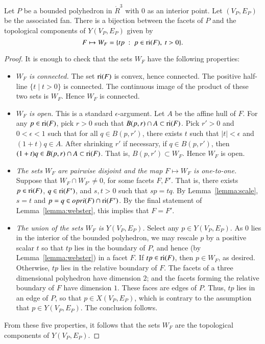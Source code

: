 \begin{lemma} Let $P$ be a bounded polyhedron in $\ring{R}^3$ with $0$ as an interior point.  Let $(V_P,E_P)$ be the associated fan.  There is a bijection between the facets of $P$ and the topological components of $Y(V_P,E_P)$ given by 
$$
F \mapsto W_F = \{t p \ :\  p\in {\operatorname{ri}}(F),~t >0\}.
$$
\end{lemma}

\begin{proof} It is enough to check that the sets $W_F$ have the following properties:
\begin{itemize}
\item {\it $W_F$ is connected.}  The set ${\operatorname{ri}}(F)$ is convex, hence connected.  The positive half-line $\{t\mid t>0\}$ is connected.  The continuous image of the product of these two sets is $W_F$.  Hence $W_F$ is connected.
\item {\it $W_F$ is  open.}  This is a standard $\epsilon$-argument.  Let $A$ be the affine hull of $F$.  For any $p\in {\operatorname{ri}}(F)$, pick $r>0$ such that $B(p,r)\cap A\subset {\operatorname{ri}}(F)$.  Pick $r'>0$ and $0<\epsilon<1$ such that for all $q\in B(p,r')$, there exists $t$ such that $|t|<\epsilon$ and $(1+t)q\in A$.  After shrinking $r'$ if necessary,  if $q\in B(p,r')$, then $(1+t)q \in B(p,r)\cap A \subset {\operatorname{ri}}(F)$.   That is, $B(p,r')\subset W_F$.  Hence $W_F$ is open.
\item {\it The sets $W_F$ are pairwise disjoint and the map $F\mapsto W_F$ is one-to-one.}  Suppose  that $W_F\cap W_{F'}\ne 0$, for some facets $F, F'$.  That is, there exists $p\in {\operatorname{ri}}(F)$, $q\in {\operatorname{ri}}(F')$, and $s,t>0$ such that
$s p = t q$.  By Lemma~\ref{lemma:scale}, $s=t$ and $p=q\in op{ri}(F)\cap {\operatorname{ri}}(F')$.  By the final statement of Lemma~\ref{lemma:webster}, this implies that $F=F'$.
\item {\it The union of the sets $W_F$ is $Y(V_P,E_P)$.}  Select any $p\in Y(V_P,E_P)$.  As $0$ lies in the interior of the bounded polyhedron, we may rescale $p$ by a positive scalar $t$ so that $t p$ lies in the boundary of $P$, and hence (by Lemma~\ref{lemma:webster}) in a facet $F$.  If $t p \in {\operatorname{ri}}(F)$, then $p\in W_F$, as desired.  Otherwise, $t p$ lies in the relative boundary of $F$.  The facets of a three dimensional polyhedron have dimension $2$; and the facets forming the relative boundary of $F$ have dimension $1$.  These faces are edges of $P$.  Thus, $t p$ lies in an edge of $P$, so that $p\in X(V_P,E_P)$, which is contrary to the assumption that $p\in Y(V_P,E_P)$.  The conclusion follows.
\end{itemize}
From these five properties, it follows that the sets $W_F$ are the topological components of $Y(V_P,E_P)$.
\end{proof}


